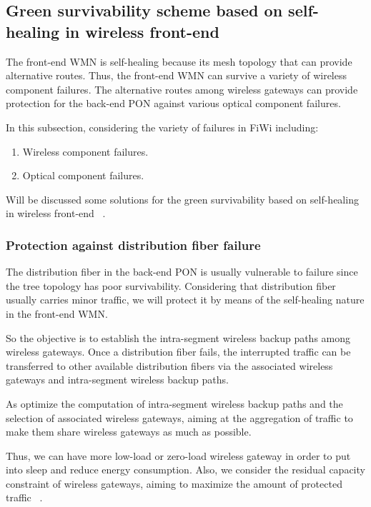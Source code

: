 \documentclass[conference,compsoc]{IEEEtran}
\begin{document}
 
\subsection{Green survivability scheme based on self-healing in wireless front-end}


The front-end WMN is self-healing because its mesh topology that can provide alternative routes. 
Thus, the front-end WMN can survive a variety of wireless component 
failures. The alternative routes among wireless gateways can provide protection for the
back-end PON against various optical component failures. 

In this subsection, considering the variety of failures in FiWi including:
\begin{enumerate}
 \item Wireless component failures.
 \item Optical component failures.
             
          
\end{enumerate}

 
Will be discussed some solutions for the green survivability based on self-healing in 
wireless front-end ~\cite{Liu201268}.


\subsubsection{Protection against distribution fiber failure}

The distribution fiber in the back-end PON is usually vulnerable to failure since the tree topology 
has poor survivability. Considering that distribution fiber usually carries minor traffic, we will 
protect it by means of the self-healing nature in the  front-end WMN.

So the objective is to establish the intra-segment wireless backup paths among wireless gateways. 
Once a distribution fiber fails, the interrupted traffic can be transferred to other available 
distribution fibers via the associated wireless gateways and intra-segment wireless backup paths. 



As optimize the computation of intra-segment wireless backup paths and the selection of associated 
wireless gateways, aiming at the aggregation of traffic to make them share wireless gateways as much 
as possible.


Thus, we can have more low-load or zero-load wireless gateway in order to put into sleep and 
reduce energy consumption. Also, we consider the residual capacity constraint of wireless gateways, 
aiming to maximize the amount of protected traffic ~\cite{Liu201268}.
\end{document}
